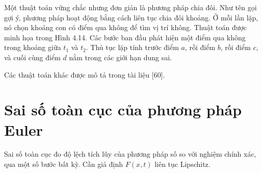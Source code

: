 Một thuật toán vững chắc nhưng đơn giản là phương pháp chia đôi. Như tên gọi gợi ý, phương pháp hoạt động bằng cách liên tục chia đôi khoảng. Ở mỗi lần lặp, nó chọn khoảng con có điểm qua không để tìm vị trí không. Thuật toán được minh họa trong Hình 4.14. Các bước ban đầu phát hiện một điểm qua không trong khoảng giữa $t_1$ và $t_2$. Thủ tục lặp tính trước điểm $a$, rồi điểm $b$, rồi điểm $c$, và cuối cùng điểm $d$ nằm trong các giới hạn dung sai.

Các thuật toán khác được mô tả trong tài liệu [60].

\section{Sai số toàn cục của phương pháp Euler}
Sai số toàn cục đo độ lệch tích lũy của phương pháp số so với nghiệm chính xác, qua một số bước bất kỳ. Cần giả định $F(x,t)$ liên tục Lipschitz.

